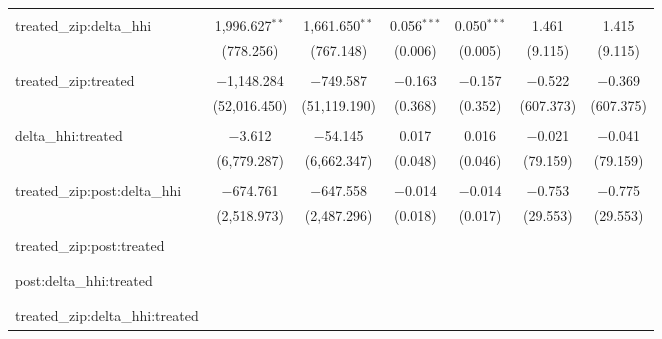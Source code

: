 \begin{table}[H]
{\begin{tabular}{@{\extracolsep{5pt}}lcccccc}
   & & & & & & \\  

  treated\_zip:delta\_hhi & 1,996.627$^{**}$ & 1,661.650$^{**}$ & 0.056$^{***}$ & 0.050$^{***}$ & 1.461 & 1.415 \\  

   & (778.256) & (767.148) & (0.006) & (0.005) & (9.115) & (9.115) \\  

   & & & & & & \\  

  treated\_zip:treated & $-$1,148.284 & $-$749.587 & $-$0.163 & $-$0.157 & $-$0.522 & $-$0.369 \\  

   & (52,016.450) & (51,119.190) & (0.368) & (0.352) & (607.373) & (607.375) \\  

   & & & & & & \\  

  delta\_hhi:treated & $-$3.612 & $-$54.145 & 0.017 & 0.016 & $-$0.021 & $-$0.041 \\  

   & (6,779.287) & (6,662.347) & (0.048) & (0.046) & (79.159) & (79.159) \\  

   & & & & & & \\  

  treated\_zip:post:delta\_hhi & $-$674.761 & $-$647.558 & $-$0.014 & $-$0.014 & $-$0.753 & $-$0.775 \\  

   & (2,518.973) & (2,487.296) & (0.018) & (0.017) & (29.553) & (29.553) \\  

   & & & & & & \\  

  treated\_zip:post:treated &  &  &  &  &  &  \\  

   &  &  &  &  &  &  \\  

   & & & & & & \\  

  post:delta\_hhi:treated &  &  &  &  &  &  \\  

   &  &  &  &  &  &  \\  

   & & & & & & \\  

  treated\_zip:delta\_hhi:treated &  &  &  &  &  &  \\  


\end{tabular}}
\end{table}
